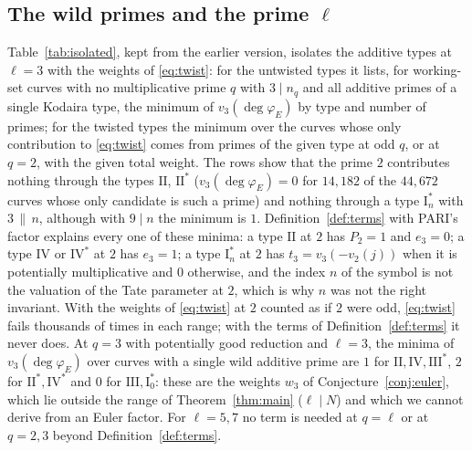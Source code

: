 \documentclass[11pt]{amsart}
\theoremstyle{definition}
\newcommand{\degphi}{\deg\varphi_E}
\begin{document}
\subsection{The wild primes and the prime \texorpdfstring{$\ell$}{l}}\label{sec:wild}
Table~\ref{tab:isolated}, kept from the earlier version, isolates the additive types at $\ell=3$ with the weights of \eqref{eq:twist}: for the untwisted types it lists, for working-set curves with no multiplicative prime $q$ with $3\mid n_q$ and all additive primes of a single Kodaira type, the minimum of $v_3(\degphi)$ by type and number of primes; for the twisted types the minimum over the curves whose only contribution to \eqref{eq:twist} comes from primes of the given type at odd $q$, or at $q=2$, with the given total weight. The rows show that the prime $2$ contributes nothing through the types $\mathrm{II}$, $\mathrm{II}^*$ ($v_3(\degphi)=0$ for $14{,}182$ of the $44{,}672$ curves whose only candidate is such a prime) and nothing through a type $\mathrm{I}_n^*$ with $3\,\|\,n$, although with $9\mid n$ the minimum is $1$. Definition~\ref{def:terms} with PARI's factor explains every one of these minima: a type $\mathrm{II}$ at $2$ has $P_2=1$ and $e_3=0$; a type $\mathrm{IV}$ or $\mathrm{IV}^*$ at $2$ has $e_3=1$; a type $\mathrm{I}_n^*$ at $2$ has $t_3=v_3(-v_2(j))$ when it is potentially multiplicative and $0$ otherwise, and the index $n$ of the symbol is not the valuation of the Tate parameter at $2$, which is why $n$ was not the right invariant. With the weights of \eqref{eq:twist} at $2$ counted as if $2$ were odd, \eqref{eq:twist} fails thousands of times in each range; with the terms of Definition~\ref{def:terms} it never does. At $q=3$ with potentially good reduction and $\ell=3$, the minima of $v_3(\degphi)$ over curves with a single wild additive prime are $1$ for $\mathrm{II},\mathrm{IV},\mathrm{III}^*$, $2$ for $\mathrm{II}^*,\mathrm{IV}^*$ and $0$ for $\mathrm{III},\mathrm{I}_0^*$: these are the weights $w_3$ of Conjecture~\ref{conj:euler}, which lie outside the range of Theorem~\ref{thm:main} ($\ell\mid N$) and which we cannot derive from an Euler factor. For $\ell=5,7$ no term is needed at $q=\ell$ or at $q=2,3$ beyond Definition~\ref{def:terms}.

\begin{table}[ht]
\centering\small

\caption{Minimum of $v_3(\degphi)$ (number of curves) over working-set curves with $E[3]$ irreducible whose only possible contributions at $3$ come from the primes named in the row, with the given number of primes (untwisted rows) or total weight of \eqref{eq:twist} (twisted rows).}\label{tab:isolated}
\end{table}
\end{document}
